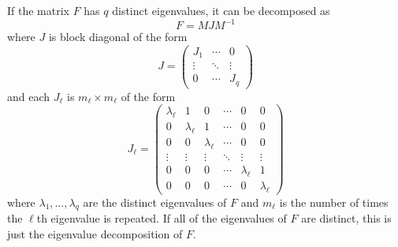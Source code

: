 \documentclass[12pt,fleqn]{article}
\begin{document}
If the matrix $F$ has $q$ distinct
eigenvalues, it can be decomposed as
\[
F = M J M^{-1}
\]
where $J$ is block diagonal of the form
\[
J = \begin{pmatrix}
  J_1 & \cdots & 0 \\
  \vdots & \ddots & \vdots \\
  0 & \cdots & J_q
\end{pmatrix}
\]
and each $J_\ell$ is $m_\ell \times m_\ell$ of the form
\[
J_\ell =
\begin{pmatrix}
  \lambda_\ell & 1 & 0 & \cdots & 0 & 0 \\
  0 & \lambda_\ell & 1 & \cdots & 0 & 0 \\
  0 & 0 & \lambda_\ell & \cdots & 0 & 0 \\
  \vdots & \vdots & \vdots & \ddots & \vdots & \vdots \\
  0 & 0 & 0 & \cdots & \lambda_\ell & 1 \\
  0 & 0 & 0 & \cdots & 0 & \lambda_\ell
\end{pmatrix}
\]
where $\lambda_1,\dots,\lambda_q$ are the distinct eigenvalues of $F$
and $m_\ell$ is the number of times the $\ell$th eigenvalue is
repeated.  If all of the eigenvalues of $F$ are distinct, this is just
the eigenvalue decomposition of $F$.
\end{document}
